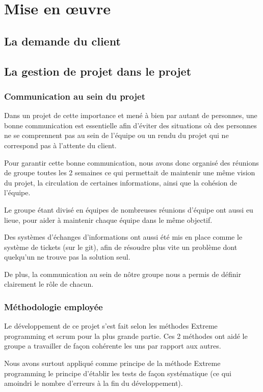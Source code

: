 \chapter{Mise en œuvre}
\section{La demande du client}


\section{La gestion de projet dans le projet}

\subsection{Communication au sein du projet}

Dans un projet de cette importance et mené à bien par autant de personnes, une bonne communication est essentielle afin d'éviter des situations où des personnes ne se comprennent pas au sein de l'équipe ou un rendu du projet qui ne correspond pas à l'attente du client.

Pour garantir cette bonne communication, nous avons donc organisé des réunions de groupe toutes les 2 semaines ce qui permettait de maintenir une même vision du projet, la circulation de certaines informations, ainsi que la cohésion de l'équipe.

Le groupe étant divisé en équipes de nombreuses réunions d'équipe ont aussi eu lieue, pour aider à maintenir chaque équipe dans le même objectif.

Des systèmes d'échanges d'informations ont aussi été mis en place comme le système de tickets (sur le git), afin de résoudre plus vite un problème dont quelqu'un ne trouve pas la solution seul.

De plus, la communication au sein de nôtre groupe nous a permis de définir clairement le rôle de chacun.

\subsection{Méthodologie employée}

Le développement de ce projet s'est fait selon les méthodes Extreme programming et scrum pour la plus grande partie. Ces 2 méthodes ont aidé le groupe a travailler de façon cohérente les uns par rapport aux autres.

Nous avons surtout appliqué comme principe de la méthode Extreme programming le principe d'établir les tests de façon systématique (ce qui amoindri le nombre d'erreurs à la fin du développement).

